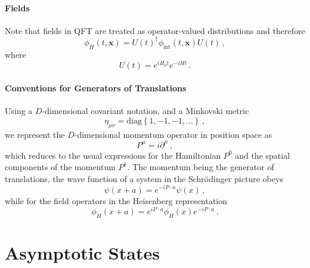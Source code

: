 \paragraph{Fields} Note that fields in QFT are treated as operator-valued 
distributions and therefore
\begin{equation}
    \label{eq:HvIntFields}
    \phi_H(t,\mathbf{x}) = U(t)^\dagger \phi_{\mathrm{int}}(t,\mathbf{x}) 
    U(t)\, ,
\end{equation}
where
\begin{equation}
    \label{eq:Uoperator}
    U(t) = e^{iH_0t} e^{-iHt}\, .
\end{equation}

\paragraph{Conventions for Generators of Translations}

Using a $D$-dimensional covariant notation, and a Minkovski metric 
\begin{equation}
    \label{eq:MostlyMinus}
    \eta_{\mu\nu} = \mathrm{diag}\left\{1, -1, -1, \ldots \right\}\, ,
\end{equation}
we represent the $D$-dimensional momentum operator in position space as
\begin{equation}
    \label{eq:MomOp}
    P^\mu = i \partial^\mu\, ,
\end{equation}
which reduces to the usual expressions for the Hamiltonian $P^0$ and the spatial
components of the momentum $P^k$. The momentum being the generator of
translations, the wave function of a system in the Schr\"odinger picture obeys
\begin{equation}
    \label{eq:PsiTranslation}
    \psi\left(x+a\right) = e^{-i P\cdot a} \psi\left(x\right)\, ,
\end{equation}
while for the field operators in the Heisenberg representation
\begin{equation}
    \label{eq:PhiTranslation}
    \phi_H(x+a) = e^{i P\cdot a} \phi_H(x) e^{-i P\cdot a}\, .
\end{equation}

\section{Asymptotic States}
\label{sec:AsymptStates}

